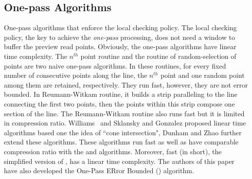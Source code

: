 

\subsection{One-pass Algorithms}


{One-pass algorithms that enforce the local checking policy}.
The local checking policy, the key to achieve the \emph{one-pass} processing, does not need a window to buffer the preview read points.
Obviously, the one-pass algorithms have linear time complexity.
%
The $n^{th}$ point routine and the routine of random-selection of points \cite{Shi:Survey} are two naive one-pass algorithms.
In these routines, for every fixed number of consecutive points along the line, the $n^{th}$ point and one random point among them are retained, respectively.
They run fast, however, they are not error bounded.
%
In Reumann-Witkam routine\cite{Reumann:Strip}, it builds a strip paralleling to the line connecting the first two points, then the points within this strip compose one section of the line.
The Reumann-Witkam routine also runs fast but it is limited in compression ratio.
%
Williams~\cite{Williams:Longest} and Sklansky and Gonzalez \cite{Sklansky:Cone} proposed linear time algorithms based one the idea of ``cone intersection", Dunham \cite{Dunham:Cone} and Zhao \cite{Zhao:Sleeve} further extend these algorithms.
These algorithms run fast as well as have comparable compression ratio with the \dpa and \pavlidis algorithms.
%
Moreover, {fast \bqsa \cite{Liu:BQS} (\fbqsa in short), the simplified version of \bqsa, has a linear time complexity.}
%
The authors of this paper have also developed the One-Pass ERror Bounded (\operb) algorithm\cite{Lin:Operb}.




